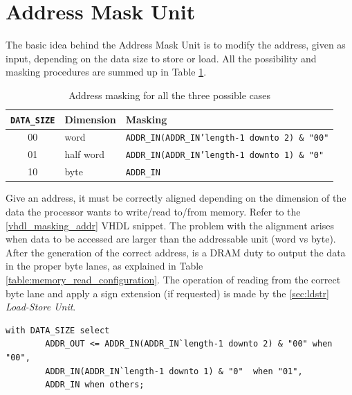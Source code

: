 \section{Address Mask Unit}
The basic idea behind the Address Mask Unit is to modify the address, given as input, depending on the data size to store or load. All the possibility and masking procedures are summed up in Table \ref{tab:addr_masking}. 

\begin{table}[ht]
    \begin{center}
        \begin{tabular}{ c| l | l}
            \texttt{DATA\_SIZE} & \textbf{Dimension} & \textbf{Masking}\\
            \hline
            00 & word & \texttt{ADDR\_IN(ADDR\_IN'length-1 downto 2) \& "00"}\\
            01 & half word & \texttt{ADDR\_IN(ADDR\_IN'length-1 downto 1) \& "0"} \\
            10 & byte & \texttt{ADDR\_IN}
            
        \end{tabular}
        \caption{Address masking for all the three possible cases}
        \label{tab:addr_masking}
    \end{center}
\end{table}


Give an address, it must be correctly aligned depending on the dimension of the data the processor wants to write/read to/from memory. Refer to the \ref{vhdl_masking_addr} VHDL snippet. The problem with the alignment arises when data to be accessed are larger than the addressable unit (word vs byte). \\

After the generation of the correct address, is a DRAM duty to output the data in the proper byte lanes, as explained in Table \ref{table:memory_read_configuration}. The operation of reading from the correct byte lane and apply a sign extension (if requested) is made by the \ref{sec:ldstr} \emph{Load-Store Unit}.



\hfill
\begin{lstlisting}[style=vhdl,caption={VHDL code for address alignment},label=vhdl_masking_addr]
    with DATA_SIZE select
        ADDR_OUT <= ADDR_IN(ADDR_IN`length-1 downto 2) & "00" when "00",
        ADDR_IN(ADDR_IN`length-1 downto 1) & "0"  when "01",
        ADDR_IN when others;
\end{lstlisting}

